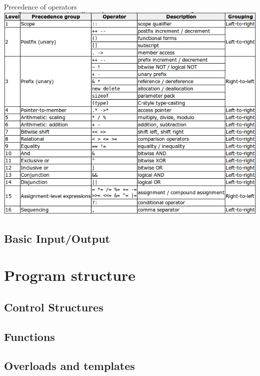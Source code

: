 \documentclass{beamer}
\begin{document}
\begin{frame}{Precedence of operators}
\includegraphics[scale=0.48]{img/OperatorPrecedence.png}
\end{frame}


\subsection{Basic Input/Output}

\section{Program structure}
\subsection{Control Structures}
\begin{frame}

\end{frame}

\subsection{Functions}
\begin{frame}

\end{frame}

\subsection{Overloads and templates}
\begin{frame}

\end{frame}
\end{document}
